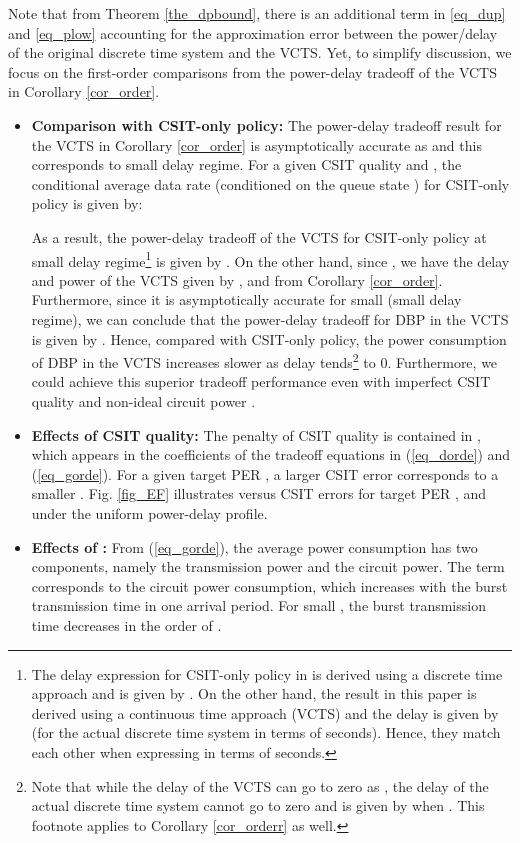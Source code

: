 \documentclass[11pt,journal, onecolumn]{./IEEEtran}
\newcommand{\blue}{\color{black}}
\newcommand{\red}{\color{black}}
\begin{document}
\begin{Remark} {\blue Note that from Theorem \ref{the_dpbound}, there is an additional  term in \eqref{eq_dup} and \eqref{eq_plow} accounting for the approximation error between the power/delay of the original discrete time system and the VCTS. Yet, to simplify discussion, we focus on the first-order comparisons from the power-delay tradeoff of the VCTS in Corollary \ref{cor_order}. }

\begin{itemize}
\item {\bf Comparison with CSIT-only policy:} The power-delay tradeoff result {\blue for the VCTS} in Corollary \ref{cor_order} is asymptotically accurate as  and this corresponds to small delay regime. For a given CSIT quality and , the conditional average data rate {\red (conditioned on the queue state )} for CSIT-only policy is given by:

As a result, the power-delay tradeoff {\blue of the VCTS}  for CSIT-only policy \cite{berry_optimal_2006} at small delay regime\footnote{\red The delay expression for CSIT-only policy in \cite{berry_optimal_2006} 
{\blue is derived using a discrete time approach and is given by} . {\blue On the other hand}, the result in this paper {\blue is  derived   using a continuous time approach (VCTS) and the delay is given by}  {\blue  (for the actual discrete time system in terms of seconds).} Hence, they match each other when expressing in terms of seconds. } is given by .  {\red On the other hand, since , we have {\blue the delay and power of the VCTS given by} , and  from Corollary \ref{cor_order}.
Furthermore, since it is asymptotically accurate for small  (small delay regime), we can conclude that the power-delay tradeoff for DBP {\blue in the VCTS} is given by . Hence, compared with CSIT-only policy, the power consumption of DBP {\blue in the VCTS}  increases slower as delay  tends\footnote{{\blue Note that while the delay of the VCTS can go to zero as , the delay of the actual discrete time system cannot go to zero and is given by  when . This footnote applies to Corollary \ref{cor_orderr} as well.}}  to 0.} Furthermore, we could achieve this superior tradeoff performance even with imperfect CSIT quality and non-ideal circuit power .

\item {\bf Effects of CSIT quality:} The penalty of CSIT quality is contained in {\red }, which appears in the coefficients of the tradeoff equations in (\ref{eq_dorde}) and (\ref{eq_gorde}). For a given target PER , a larger CSIT error corresponds to a smaller {\red }. Fig. \ref{fig_EF} illustrates  versus CSIT errors  for target PER ,  and  {\red under the uniform power-delay profile}.

\item {\bf Effects of :} From (\ref{eq_gorde}), the average power consumption has two components, namely the transmission power and the circuit power. The term  corresponds to the circuit power consumption, which increases with the burst transmission time in one arrival period. For small , the burst transmission time decreases in the order of .
~\hfill\IEEEQED
\end{itemize}
\end{Remark}
\end{document}
